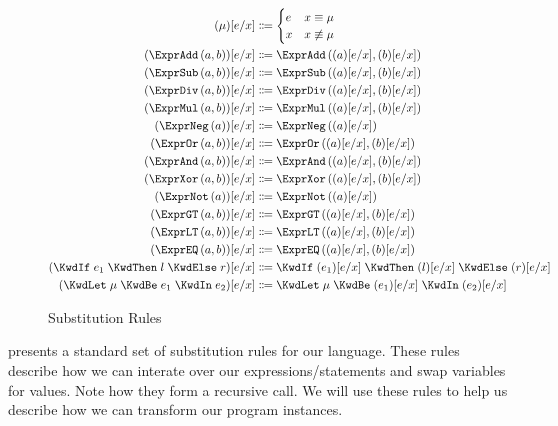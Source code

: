 \documentclass[10pt,a4paper,british,final]{article}
\begin{document}
\begin{figure}[ht]
  \centering
\begin{align*}
  \subst{\mu}{e}{x}
  &
    \Coloneqq
    \begin{cases}
      e&x\equiv\mu\\
      x&x\not\equiv\mu\\
    \end{cases}
  \\
  \subst{\exprAdd{a}{b}}{e}{x}&\Coloneqq\exprAdd{\subst{a}{e}{x}}{\subst{b}{e}{x}}\\
  \subst{\exprSub{a}{b}}{e}{x}&\Coloneqq\exprSub{\subst{a}{e}{x}}{\subst{b}{e}{x}}\\
  \subst{\exprDiv{a}{b}}{e}{x}&\Coloneqq\exprDiv{\subst{a}{e}{x}}{\subst{b}{e}{x}}\\
  \subst{\exprMul{a}{b}}{e}{x}&\Coloneqq\exprMul{\subst{a}{e}{x}}{\subst{b}{e}{x}}\\
  \subst{\exprNeg{a}}{e}{x}&\Coloneqq\exprNeg{\subst{a}{e}{x}}\\
  \subst{\exprOr{a}{b}}{e}{x}&\Coloneqq\exprOr{\subst{a}{e}{x}}{\subst{b}{e}{x}}\\
  \subst{\exprAnd{a}{b}}{e}{x}&\Coloneqq\exprAnd{\subst{a}{e}{x}}{\subst{b}{e}{x}}\\
  \subst{\exprXor{a}{b}}{e}{x}&\Coloneqq\exprXor{\subst{a}{e}{x}}{\subst{b}{e}{x}}\\
  \subst{\exprNot{a}}{e}{x}&\Coloneqq\exprNot{\subst{a}{e}{x}}\\
  \subst{\exprGT{a}{b}}{e}{x}&\Coloneqq\exprGT{\subst{a}{e}{x}}{\subst{b}{e}{x}}\\
  \subst{\exprLT{a}{b}}{e}{x}&\Coloneqq\exprLT{\subst{a}{e}{x}}{\subst{b}{e}{x}}\\
  \subst{\exprEQ{a}{b}}{e}{x}&\Coloneqq\exprEQ{\subst{a}{e}{x}}{\subst{b}{e}{x}}\\
  \subst{\stmtIf{e_1}{l}{r}}{e}{x}&\Coloneqq\stmtIf{\subst{e_1}{e}{x}}{\subst{l}{e}{x}}{\subst{r}{e}{x}}\\
  \subst{\stmtLet{\mu}{e_1}{e_2}}{e}{x}&\Coloneqq\stmtLet{\mu}{\subst{e_1}{e}{x}}{\subst{e_2}{e}{x}}
\end{align*}
  \caption{\label{fig:subst}Substitution Rules}
\end{figure}

 presents a standard set of substitution rules for our language.
These rules describe how we can interate over our expressions/statements and swap variables for values.
Note how they form a recursive call.
We will use these rules to help us describe how we can transform our program instances.
\end{document}
